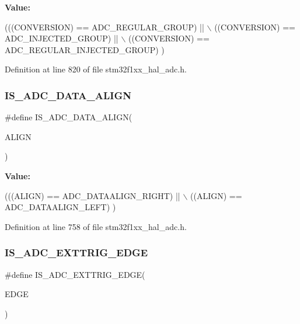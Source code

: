 {\bfseries Value\+:}
\begin{DoxyCode}
(((CONVERSION) == ADC\_REGULAR\_GROUP)         || \(\backslash\)
                                             ((CONVERSION) == ADC\_INJECTED\_GROUP)        || \(\backslash\)
                                             ((CONVERSION) == ADC\_REGULAR\_INJECTED\_GROUP)  )
\end{DoxyCode}


Definition at line 820 of file stm32f1xx\+\_\+hal\+\_\+adc.\+h.

\mbox{\label{group___a_d_c___private___macros_ga2903b620e3c61dc47ed8c0fbf4197801}} 
\subsubsection{\texorpdfstring{I\+S\+\_\+\+A\+D\+C\+\_\+\+D\+A\+T\+A\+\_\+\+A\+L\+I\+GN}{IS\_ADC\_DATA\_ALIGN}}
{\footnotesize\ttfamily \#define I\+S\+\_\+\+A\+D\+C\+\_\+\+D\+A\+T\+A\+\_\+\+A\+L\+I\+GN(\begin{DoxyParamCaption}\item[{}]{A\+L\+I\+GN }\end{DoxyParamCaption})}

{\bfseries Value\+:}
\begin{DoxyCode}
(((ALIGN) == ADC\_DATAALIGN\_RIGHT) || \(\backslash\)
                                  ((ALIGN) == ADC\_DATAALIGN\_LEFT)    )
\end{DoxyCode}


Definition at line 758 of file stm32f1xx\+\_\+hal\+\_\+adc.\+h.

\mbox{\label{group___a_d_c___private___macros_gaa862868aea997c7a9e1c808faee75e6c}} 
\subsubsection{\texorpdfstring{I\+S\+\_\+\+A\+D\+C\+\_\+\+E\+X\+T\+T\+R\+I\+G\+\_\+\+E\+D\+GE}{IS\_ADC\_EXTTRIG\_EDGE}}
{\footnotesize\ttfamily \#define I\+S\+\_\+\+A\+D\+C\+\_\+\+E\+X\+T\+T\+R\+I\+G\+\_\+\+E\+D\+GE(\begin{DoxyParamCaption}\item[{}]{E\+D\+GE }\end{DoxyParamCaption})}

